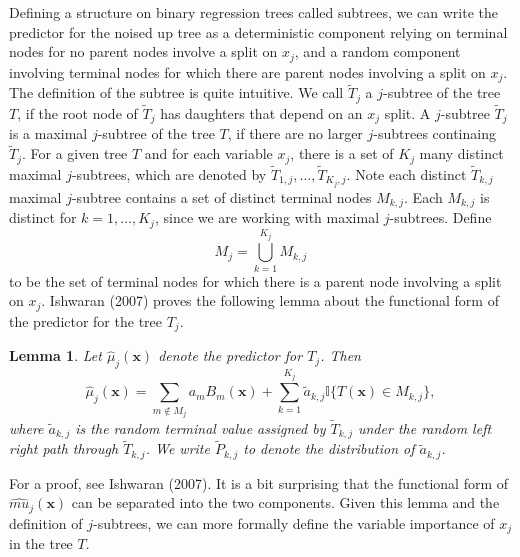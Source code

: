 \documentclass[12pt,twoside]{reedthesis}
\newtheorem{lemma}{Lemma}[chapter]
\theoremstyle{definition}
\theoremstyle{definition}
\theoremstyle{definition}
\theoremstyle{remark}
\begin{document}
Defining a structure on binary regression trees called subtrees, we can
write the predictor for the noised up tree as a deterministic component
relying on terminal nodes for no parent nodes involve a split on
\(x_j\), and a random component involving terminal nodes for which there
are parent nodes involving a split on \(x_j\). The definition of the
subtree is quite intuitive. We call \(\tilde{T}_j\) a \(j\)-subtree of
the tree \(T\), if the root node of \(\tilde{T}_j\) has daughters that
depend on an \(x_j\) split. A \(j\)-subtree \(\tilde{T}_j\) is a maximal
\(j\)-subtree of the tree \(T\), if there are no larger \(j\)-subtrees
continaing \(\tilde{T}_j\). For a given tree \(T\) and for each variable
\(x_j\), there is a set of \(K_j\) many distinct maximal \(j\)-subtrees,
which are denoted by \(\tilde{T}_{1,j},\ldots, \tilde{T}_{K_j,j}\). Note
each distinct \(\tilde{T}_{k,j}\) maximal \(j\)-subtree contains a set
of distinct terminal nodes \(M_{k,j}\). Each \(M_{k,j}\) is distinct for
\(k=1,\ldots,K_j\), since we are working with maximal \(j\)-subtrees.
Define \[M_j=\bigcup_{k=1}^{K_j} M_{k,j}\] to be the set of terminal
nodes for which there is a parent node involving a split on \(x_j\).
Ishwaran (2007) proves the following lemma about the functional form of
the predictor for the tree \(T_j\). \par
\begin{lemma}
Let $\hat{\mu}_j(\mathbf{x})$ denote the predictor for $T_j$. Then $$\hat{\mu}_j(\mathbf{x})=\sum_{m\notin M_j}a_m B_m(\mathbf{x})+\sum_{k=1}^{K_j} \tilde{a}_{k,j}\mathbb{I}\{T(\mathbf{x})\in M_{k,j}\},$$ where $\tilde{a}_{k,j}$ is the random terminal value assigned by $\tilde{T}_{k,j}$ under the random left right path through $\tilde{T}_{k,j}$. We write $\tilde{P}_{k,j}$ to denote the distribution of $\tilde{a}_{k,j}$. 
\end{lemma}
For a proof, see Ishwaran (2007). It is a bit surprising that the
functional form of \(\hat{mu}_j(\mathbf{x})\) can be separated into the
two components. Given this lemma and the definition of \(j\)-subtrees,
we can more formally define the variable importance of \(x_j\) in the
tree \(T\). \par
\end{document}
